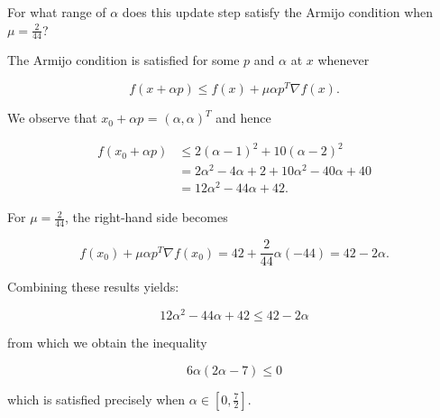 For what range of $\alpha$ does this update step satisfy the Armijo condition when $\mu = \frac{2}{44}$?

\begin{solution}
    The Armijo condition is satisfied for some $p$ and $\alpha$ at $x$ whenever

    $$
    f(x + \alpha p) \le f(x) + \mu \alpha p^T \nabla f(x).
    $$

    We observe that $x_0 + \alpha p$ = $(\alpha, \alpha)^T$ and hence

    \begin{align*}
    f(x_0 + \alpha p) &\le 2(\alpha - 1)^2 + 10(\alpha - 2)^2 \\
                      &= 2 \alpha^2 - 4 \alpha + 2 + 10 \alpha^2 - 40 \alpha + 40 \\
                      &= 12 \alpha^2 - 44 \alpha + 42.
    \end{align*}

    For $\mu = \frac{2}{44}$, the right-hand side becomes

    $$
    f(x_0) + \mu \alpha p^T \nabla f(x_0) = 42 + \frac{2}{44} \alpha \left( -44 \right) = 42 - 2 \alpha.
    $$

    Combining these results yields:

    $$
    12 \alpha^2 - 44 \alpha + 42 \le 42 - 2 \alpha
    $$

    from which we obtain the inequality

    $$
    6 \alpha (2 \alpha - 7) \le 0
    $$

    which is satisfied precisely when $\alpha \in \left[0, \frac{7}{2}\right]$.
    \ \\
\end{solution}